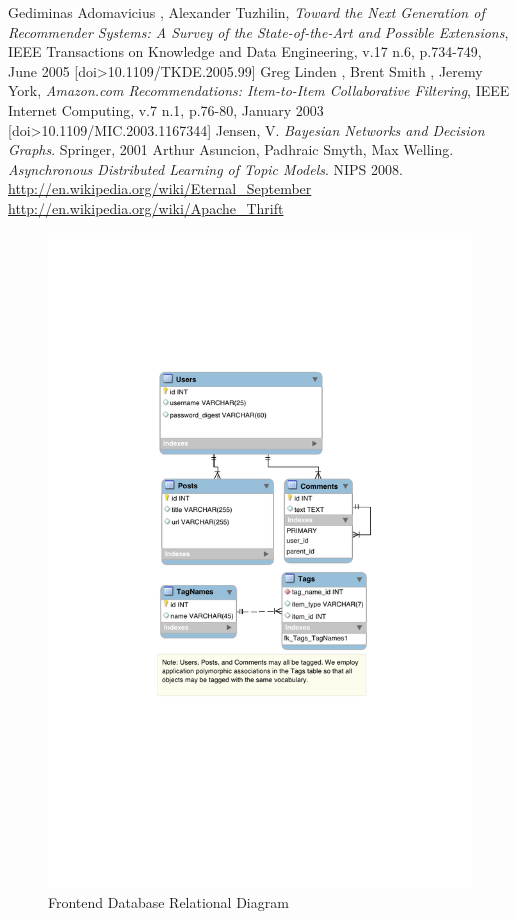 \documentclass[11pt,letterpaper]{article}
\begin{document}
\newpage
\newpage
\begin{thebibliography}{6}
   Gediminas Adomavicius , Alexander Tuzhilin, \textit{Toward the Next Generation of Recommender Systems: A Survey of the State-of-the-Art and Possible Extensions}, IEEE Transactions on Knowledge and Data Engineering, v.17 n.6, p.734-749, June 2005  [doi>10.1109/TKDE.2005.99]
   Greg Linden , Brent Smith , Jeremy York, \textit{Amazon.com Recommendations: Item-to-Item Collaborative Filtering}, IEEE Internet Computing, v.7 n.1, p.76-80, January 2003  [doi>10.1109/MIC.2003.1167344]
   Jensen, V. \textit{Bayesian Networks and Decision Graphs}. Springer, 2001
   Arthur Asuncion, Padhraic Smyth, Max Welling. \textit{Asynchronous Distributed Learning of Topic Models}. NIPS 2008. 
   \url{http://en.wikipedia.org/wiki/Eternal\_September}
   \url{http://en.wikipedia.org/wiki/Apache\_Thrift}
\end{thebibliography}

\begin{figure}
\centering
\includegraphics{db_diagram.pdf}
\caption{Frontend Database Relational Diagram}
\label{fig:database}
\end{figure}

\end{document}
